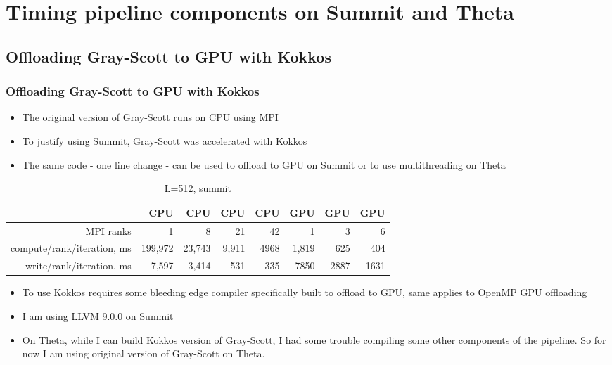 \section{Timing pipeline components on Summit and Theta}

\subsection{Offloading Gray-Scott to GPU with Kokkos}

\begin{frame}[fragile]
  \frametitle{Offloading Gray-Scott to GPU with Kokkos}
  \begin{itemize}
  \item The original version of Gray-Scott runs on CPU using MPI
  \item To justify using Summit, Gray-Scott was accelerated with Kokkos
  \item The same code - one line change - can be used to offload to GPU on Summit or to use multithreading on Theta
  \end{itemize}

  {\tiny
    \begin{table}[H]
      \centering
      \begin{tabular}{|r||r|r|r|r||r|r|r|}
        \hline
	& CPU & CPU & CPU & CPU & GPU & GPU & GPU\\
        \hline
	MPI ranks & 1 & 8 & 21 & 42 & 1 & 3 & 6\\
        \hline
	compute/rank/iteration, ms & 199,972 & 23,743 & 9,911 & 4968 & 1,819 & 625 & 404\\
        \hline
	write/rank/iteration, ms & 7,597 & 3,414 & 531 & 335 & 7850 & 2887 & 1631\\
        \hline
      \end{tabular}
      \caption{L=512, summit}
      \label{kokkos_512_summit}
    \end{table}
  }
  
  \begin{itemize}
  \item To use Kokkos requires some bleeding edge compiler specifically built to offload to GPU, same applies to OpenMP GPU offloading
  \item I am using LLVM 9.0.0 on Summit
  \item On Theta, while I can build Kokkos version of Gray-Scott, I had some trouble compiling some other components of the pipeline.
    So for now I am using original version of Gray-Scott on Theta.
  \end{itemize}

\end{frame}


